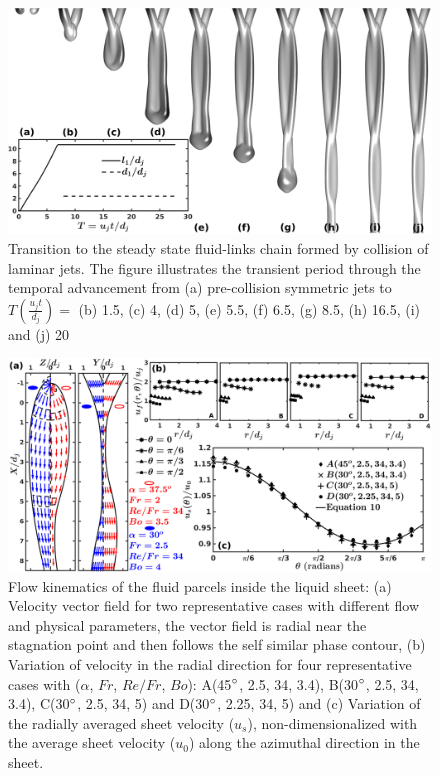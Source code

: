 \documentclass{jfm}
\begin{document}
\begin{figure}
	\centering
	\includegraphics[width=\linewidth]{fig0}
	\caption{Transition to the steady state fluid-links chain formed by collision of laminar jets. The figure illustrates the transient period through the temporal advancement from (a) pre-collision symmetric jets to $T (\frac{u_jt}{d_j}) = $ (b) 1.5, (c) 4, (d) 5, (e) 5.5, (f) 6.5, (g) 8.5, (h) 16.5, (i) and (j) 20}
	\label{Figure::transient}
\end{figure}
\clearpage
\begin{figure}
	\centering
	\includegraphics[width=\linewidth]{velocityVectors}
	\caption{Flow kinematics of the fluid parcels inside the liquid sheet: (a) Velocity vector field for two representative cases with different flow and physical parameters, the vector field is radial near the stagnation point and then follows the self similar phase contour, (b) Variation of velocity in the radial direction for four representative cases with ($\alpha$, $Fr$, $Re/Fr$, $Bo$): A(45$\degree$, 2.5, 34, 3.4), B(30$\degree$, 2.5, 34, 3.4), C(30$\degree$, 2.5, 34, 5) and D(30$\degree$, 2.25, 34, 5) and (c) Variation of the radially averaged sheet velocity ($u_s$), non-dimensionalized with the average sheet velocity ($u_0$) along the azimuthal direction in the sheet.}
	\label{Figure::velocityVectors}
\end{figure}
\end{document}
